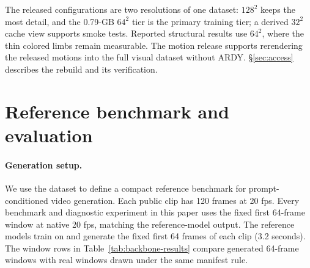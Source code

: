\documentclass[10pt,twocolumn,letterpaper]{article}
\begin{document}
The released configurations are two resolutions of one dataset: $128^2$ keeps the most detail, and the 0.79-GB
$64^2$ tier is the primary training tier; a derived $32^2$ cache view supports smoke tests. Reported structural
results use $64^2$, where the thin colored limbs remain measurable. The motion release supports rerendering
the released motions into the full visual dataset without ARDY. \S\ref{sec:access} describes the rebuild
and its verification.

\section{Reference benchmark and evaluation}
\paragraph{Generation setup.} We use the dataset to define a compact reference benchmark for
prompt-conditioned video generation. Each public clip has 120 frames at 20 fps. Every benchmark and
diagnostic experiment in this paper uses the fixed first 64-frame window at native 20 fps, matching the
reference-model output. The reference models train on and generate the fixed first 64 frames of each clip
(3.2 seconds). The window rows in
Table~\ref{tab:backbone-results} compare generated 64-frame windows with real windows drawn under the same
manifest rule.
\end{document}
